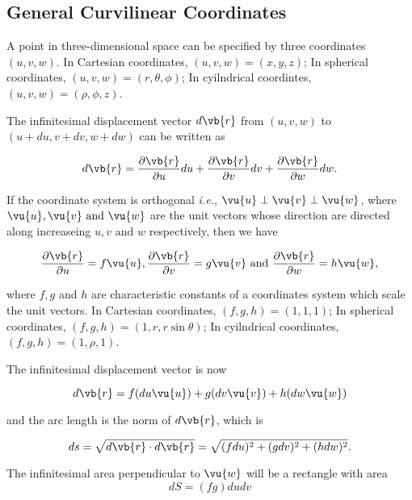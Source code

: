 \documentclass[english,a4paper,12pt]{report}
\begin{document}
\subsection{General Curvilinear Coordinates}

A point in three-dimensional space can be specified by three coordinates \((u,v,w)\). In Cartesian coordinates, \((u,v,w) = (x,y,z)\); In spherical coordinates, \((u,v,w) = (r, \theta, \phi)\); In cyilndrical coordintes, \((u,v,w) = (\rho, \phi, z)\). 

The infinitesimal displacement vector \(d \vb{r} \)  from \((u,v,w)\) to \((u+du, v+dv, w+dw)\) can be written as

\begin{equation} 
	d\vb{r} = \frac{\partial \vb{r} }{\partial u} du + \frac{\partial \vb{r} }{\partial v}dv + \frac{\partial \vb{r} }{\partial w}dw. 
\end{equation}

If the coordinate system is orthogonal \textit{i.e.,} \(\vu{u} \perp \vu{v} \perp \vu{w}\), where \(\vu{u} ,\vu{v} \text { and } \vu{w} \) are the unit vectors whose direction are directed along increaseing \(u, v \text { and } w\) respectively, then we have

\begin{equation}
    \frac{\partial \vb{r} }{\partial u} = f \vu{u}, \frac{\partial \vb{r} }{\partial v} = g \vu{v}  \text { and } \frac{\partial \vb{r} }{\partial w} = h \vu{w}  ,
\end{equation}

where \(f,g\) and \(h\) are characteristic constants of a coordinates system which scale the unit vectors. In Cartesian coordinates, \((f,g,h) = (1,1,1)\); In spherical coordinates, \((f,g,h) = (1,r,r\sin{\theta})\); In cyilndrical coordinates, \((f,g,h) = (1,\rho ,1)\).
	
The infinitesimal displacement vector is now 

\begin{equation}
    d \vb{r} = f(du\vu{u}) + g(dv\vu{v}) + h(dw\vu{w}) \label{dl} 
\end{equation}

and the arc length is the norm of \(d \vb{r} \), which is 

\begin{equation}
    ds = \sqrt{d \vb{r} \cdot d \vb{r} } = \sqrt{(fdu)^2 + (gdv)^2 + (hdw)^2}.  
\end{equation}



The infinitesimal area perpendicular to \(\vu{w}\) will be a rectangle with area
\begin{equation}
	dS = (fg)dudv \label{da}
\end{equation} 
\end{document}
